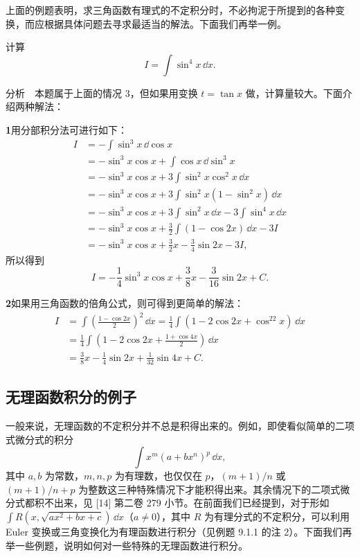 \begin{xremark}
上面的例题表明，求三角函数有理式的不定积分时，不必拘泥于所提到的各种变换，而应根据具体问题去寻求最适当的解法。下面我们再举一例。
\end{xremark}

\begin{xexample}[9.2.6]
计算
\[
  I=\int\sin^4x\,\dd x.
\]
\end{xexample}

分析　本题属于上面的情况 3，但如果用变换 $t=\tan x$ 做，计算量较大。下面介绍两种解法：

\begin{xsolution}
\textbf{1}\quad 用分部积分法可进行如下：
\begin{align*}
  I
  &=-\int\sin^3x\,\dd\cos x\\
  &=-\sin^3x\cos x+\int\cos x\,\dd\sin^3x\\
  &=-\sin^3x\cos x+3\int\sin^2x\cos^2x\,\dd x\\
  &=-\sin^3x\cos x+3\int\sin^2x(1-\sin^2x)\,\dd x\\
  &=-\sin^3x\cos x+3\int\sin^2x\,\dd x-3\int\sin^4x\,\dd x\\
  &=-\sin^3x\cos x+\frac32\int(1-\cos2x)\,\dd x-3I\\
  &=-\sin^3x\cos x+\frac32x-\frac34\sin2x-3I,
\end{align*}
所以得到
\[
  I=-\frac14\sin^3x\cos x+\frac38x-\frac3{16}\sin2x+C.
\]
\end{xsolution}

\begin{xsolution}
\textbf{2}\quad 如果用三角函数的倍角公式，则可得到更简单的解法：
\begin{align*}
  I
  &=\int\left(\frac{1-\cos2x}{2}\right)^2\,\dd x
   =\frac14\int(1-2\cos2x+\cos^22x)\,\dd x\\
  &=\frac14\int\left(1-2\cos2x+\frac{1+\cos4x}{2}\right)\,\dd x\\
  &=\frac38x-\frac14\sin2x+\frac1{32}\sin4x+C.
\end{align*}
\end{xsolution}

\subsection{无理函数积分的例子}

一般来说，无理函数的不定积分并不总是积得出来的。例如，即使看似简单的二项式微分式的积分
\[
  \int x^m(a+bx^n)^p\,\dd x,
\]
其中 $a,b$ 为常数，$m,n,p$ 为有理数，也仅仅在 $p$，$(m+1)/n$ 或 $(m+1)/n+p$ 为整数这三种特殊情况下才能积得出来。其余情况下的二项式微分式都积不出来，见 [14] 第二卷 279 小节。在前面我们已经提到，对于形如 $\int R(x,\sqrt{ax^2+bx+c})\,\dd x$（$a\ne0$），其中 $R$ 为有理分式的不定积分，可以利用 Euler 变换或三角变换化为有理函数进行积分（见例题 9.1.1 的注 2）。下面我们再举一些例题，说明如何对一些特殊的无理函数进行积分。

